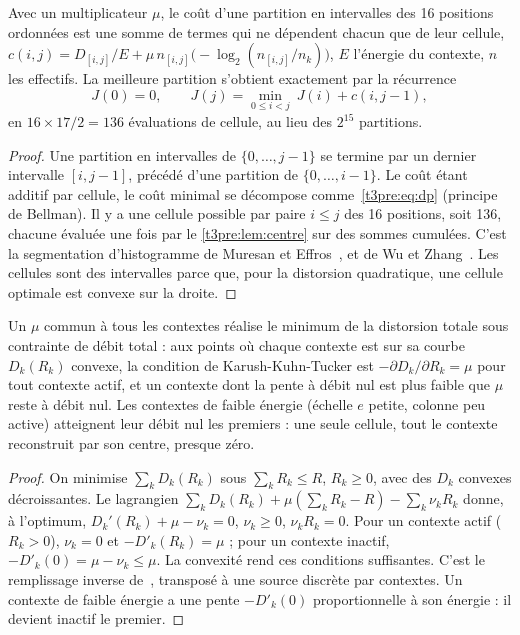 \begin{lemme}\label{t3pre:lem:dp}
Avec un multiplicateur $\mu$, le coût d'une partition en intervalles des 16 positions ordonnées est une somme de termes qui ne dépendent chacun que de leur cellule, $c(i, j) = D_{[i,j]}/E + \mu\, n_{[i,j]} \bigl(-\log_2 (n_{[i,j]}/n_k)\bigr)$, $E$ l'énergie du contexte, $n$ les effectifs. La meilleure partition s'obtient exactement par la récurrence
\begin{equation}\label{t3pre:eq:dp}
J(0) = 0, \qquad J(j) = \min_{0 \le i < j}\ J(i) + c(i, j - 1),
\end{equation}
en $16 \times 17 / 2 = 136$ évaluations de cellule, au lieu des $2^{15}$ partitions.
\end{lemme}

\begin{proof}
Une partition en intervalles de $\{0, \ldots, j-1\}$ se termine par un dernier intervalle $[i, j-1]$, précédé d'une partition de $\{0, \ldots, i-1\}$. Le coût étant additif par cellule, le coût minimal se décompose comme~\eqref{t3pre:eq:dp} (principe de Bellman). Il y a une cellule possible par paire $i \le j$ des 16 positions, soit 136, chacune évaluée une fois par le \cref{t3pre:lem:centre} sur des sommes cumulées. C'est la segmentation d'histogramme de Muresan et Effros~\cite{genome-pe-muresan2002}, et de Wu et Zhang~\cite{genome-pe-wu1993}. Les cellules sont des intervalles parce que, pour la distorsion quadratique, une cellule optimale est convexe sur la droite.
\end{proof}

\begin{proposition}\label{t3pre:prop:remplissage}
Un $\mu$ commun à tous les contextes réalise le minimum de la distorsion totale sous contrainte de débit total : aux points où chaque contexte est sur sa courbe $D_k(R_k)$ convexe, la condition de Karush-Kuhn-Tucker est $-\partial D_k/\partial R_k = \mu$ pour tout contexte actif, et un contexte dont la pente à débit nul est plus faible que $\mu$ reste à débit nul. Les contextes de faible énergie (échelle $e$ petite, colonne peu active) atteignent leur débit nul les premiers : une seule cellule, tout le contexte reconstruit par son centre, presque zéro.
\end{proposition}

\begin{proof}
On minimise $\sum_k D_k(R_k)$ sous $\sum_k R_k \le R$, $R_k \ge 0$, avec des $D_k$ convexes décroissantes. Le lagrangien $\sum_k D_k(R_k) + \mu(\sum_k R_k - R) - \sum_k \nu_k R_k$ donne, à l'optimum, $D_k'(R_k) + \mu - \nu_k = 0$, $\nu_k \ge 0$, $\nu_k R_k = 0$. Pour un contexte actif ($R_k > 0$), $\nu_k = 0$ et $-D'_k(R_k) = \mu$ ; pour un contexte inactif, $-D'_k(0) = \mu - \nu_k \le \mu$. La convexité rend ces conditions suffisantes. C'est le remplissage inverse de~\cite[th. 10.3.3]{cover2006}, transposé à une source discrète par contextes. Un contexte de faible énergie a une pente $-D'_k(0)$ proportionnelle à son énergie : il devient inactif le premier.
\end{proof}

